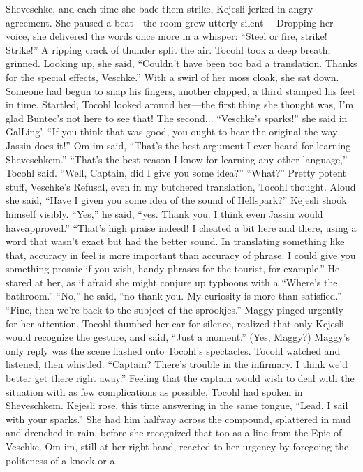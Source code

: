 \documentclass[9pt]{article}
\begin{document}
Sheveschke, and each time she bade them strike, Kejesli jerked in angry agreement. She paused a
beat—the room grew utterly silent—
Dropping her voice, she delivered the words once more in a whisper: “Steel or fire, strike! Strike!”
A ripping crack of thunder split the air. Tocohl took a deep breath, grinned. Looking up, she said,
“Couldn’t have been too bad a translation. Thanks for the special effects, Veschke.” With a swirl of her
moss cloak, she sat down.
Someone had begun to snap his fingers, another clapped, a third stamped his feet in time. Startled,
Tocohl looked around her—the first thing she thought was, I’m glad Buntec’s not here to see that! The
second...
“Veschke’s sparks!” she said in GalLing’. “If you think that was good, you ought to hear the original
the way Jassin does it!”
Om im said, “That’s the best argument I ever heard for learning Sheveschkem.”
“That’s the best reason I know for learning any other language,” Tocohl said. “Well, Captain, did I
give you some idea?”
“What?”
Pretty potent stuff, Veschke’s Refusal, even in my butchered translation, Tocohl thought. Aloud she
said, “Have I given you some idea of the sound of Hellspark?”
Kejesli shook himself visibly. “Yes,” he said, “yes. Thank you. I think even Jassin would haveapproved.”
“That’s high praise indeed! I cheated a bit here and there, using a word that wasn’t exact but had the
better sound. In translating something like that, accuracy in feel is more important than accuracy of
phrase. I could give you something prosaic if you wish, handy phrases for the tourist, for example.”
He stared at her, as if afraid she might conjure up typhoons with a “Where’s the bathroom.”
“No,” he said, “no thank you. My curiosity is more than satisfied.”
“Fine, then we’re back to the subject of the sprookjes.”
Maggy pinged urgently for her attention. Tocohl thumbed her ear for silence, realized that only
Kejesli would recognize the gesture, and said, “Just a moment.”
(Yes, Maggy?)
Maggy’s only reply was the scene flashed onto Tocohl’s spectacles. Tocohl watched and listened,
then whistled. “Captain? There’s trouble in the infirmary. I think we’d better get there right away.”
Feeling that the captain would wish to deal with the situation with as few complications as possible,
Tocohl had spoken in Sheveschkem. Kejesli rose, this time answering in the same tongue, “Lead, I sail
with your sparks.”
She had him halfway across the compound, splattered in mud and drenched in rain, before she
recognized that too as a line from the Epic of Veschke.
Om im, still at her right hand, reacted to her urgency by foregoing the politeness of a knock or a
\end{document}
